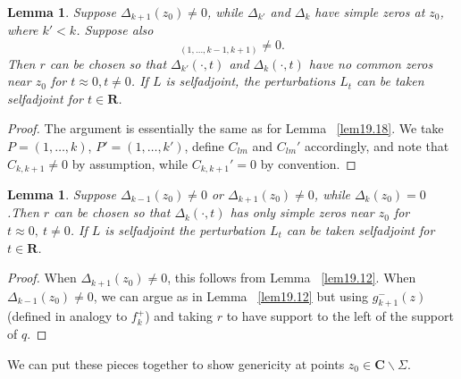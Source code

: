 \documentclass{surv-l}
\theoremstyle{plain}
\newtheorem{lemma}[theorem]{Lemma}
\theoremstyle{definition}
\numberwithin{equation}{chapter}
\begin{document}
\setcounter{theorem}{20}
\begin{lemma}\label{lem19.21}  Suppose $\Delta_{k+1}(z_{0})\neq 0$,  while $\Delta_{k'}$ and $\Delta_{k}$ have simple zeros at $z_{0}$, where $k'<k$. Suppose also
\begin{equation*}
[f_{k}^{+}(z_{0})]_{(1,\ldots,k-1,k+1)}\neq 0.
\end{equation*}
Then $r$ can be chosen so that $\Delta_{k'}(\cdot, t)$ and $\Delta_{k}(\cdot,t)$ have no common zeros near $z_{0}$ for $t\approx 0,t\neq 0$. If $L$ is selfadjoint, the perturbations $L_{t}$ can be taken selfadjoint for $t\in \mathbf{R}$.
\end{lemma}
\begin{proof} The argument is essentially the same as for Lemma ~\ref{lem19.18}. We take $P= (1,\ldots, k)$, $P'=(1, \ldots, k')$, define $C_{lm}$ and $C_{lm}'$ accordingly, and note that $C_{k,k+1}\neq 0$ by assumption, while $C_{k,k+1}'=0$ by convention.
\end{proof}
\begin{lemma}\label{lem19.22} Suppose $\Delta_{k-1}(z_{0})\neq 0$ or $\Delta_{k+1}(z_{0})\neq 0$,  while $\Delta_{k}(z_{0})=0$.Then $r$ can be chosen so that $\Delta_{k}(\cdot,t)$ has only simple zeros near $z_{0}$ for $t\approx 0,\ t\neq 0$. If $L$ is selfadjoint the perturbation $L_{t}$ can be taken selfadjoint for $t\in \mathbf{R}$.
\end{lemma}
\begin{proof} When $\Delta_{k+1}(z_{0})\neq 0$, this follows from Lemma ~\ref{lem19.12}. When $\Delta_{k-1}(z_{0})\neq 0$, we can argue as in Lemma ~\ref{lem19.12} but using $g_{k+1}^{-}(z)$ (defined in analogy to $f_{k}^{+}$) and taking $r$ to have support to the left of the support of $q.$
\end{proof}
We can put these pieces together to show genericity at points $ z_{0}\in \mathbf{C}\backslash \Sigma$.
\end{document}
